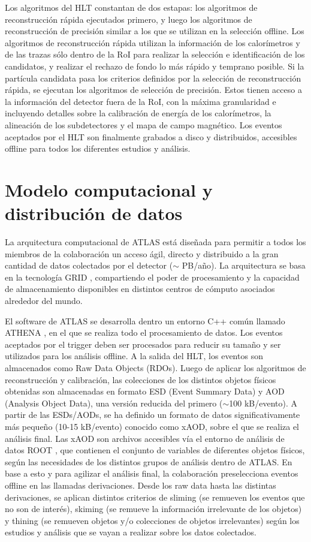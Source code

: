Los algoritmos del HLT constantan de dos estapas: los algoritmos de reconstrucción rápida ejecutados primero, y luego los algoritmos de reconstrucción de precisión similar a los que se utilizan en la selección offline. Los algoritmos de reconstrucción rápida utilizan la información de los calorímetros y de las trazas sólo dentro de la RoI para realizar la selección e identificación de los candidatos, y realizar el rechazo de fondo lo más rápido y temprano posible. Si la partícula candidata pasa los criterios definidos por la selección de reconstrucción rápida, se ejecutan los algoritmos de selección de precisión. Estos tienen acceso a la información del detector fuera de la RoI, con la máxima granularidad e incluyendo detalles sobre la calibración de energía de los calorímetros, la alineación de los subdetectores y el mapa de campo magnético. Los eventos aceptados por el HLT son finalmente grabados a disco y distribuidos, accesibles offline para todos los diferentes estudios y análisis.

\section{Modelo computacional y distribución de datos}


La arquitectura computacional de ATLAS está diseñada para permitir a todos los miembros de la colaboración un acceso ágil, directo y distribuido a la gran cantidad de datos colectados por el detector ($\sim$ PB/año). La arquitectura se basa en la tecnología GRID \cite{grid}, compartiendo el poder de procesamiento y la capacidad de almacenamiento disponibles en distintos centros de cómputo asociados alrededor del
mundo.

El software de ATLAS se desarrolla dentro un entorno C++ común llamado ATHENA \cite{ATLAS-TDR-17, analysistools, athena}, en el que se realiza todo el procesamiento de datos. Los eventos aceptados por el trigger deben ser procesados para reducir su tamaño y ser utilizados para los análisis offline. A la salida del HLT, los eventos son almacenados como Raw Data Objects (RDOs). Luego de aplicar los algoritmos de reconstrucción y calibración, las colecciones de los distintos objetos físicos obtenidas son almacenadas en formato ESD (Event Summary Data) y AOD (Analysis Object Data), una versión reducida del primero ($\sim$100 kB/evento). A partir de las ESDs/AODs, se ha definido un formato de datos significativamente más pequeño (10-15 kB/evento) conocido como xAOD, sobre el que se realiza el análisis final. Las xAOD son archivos accesibles vía el entorno de análisis de datos ROOT \cite{root}, que contienen el conjunto de variables de diferentes objetos físicos, según las necesidades de los distintos grupos de análisis dentro de ATLAS. En base a esto y para agilizar el análisis final, la colaboración preselecciona eventos offline en las llamadas derivaciones. Desde los raw data hasta las distintas derivaciones, se aplican distintos criterios de sliming (se remueven los eventos que no son de interés), skiming (se remueve la información irrelevante de los objetos) y thining (se remueven objetos y/o colecciones de objetos irrelevantes) según los estudios y análisis que se vayan a realizar sobre los datos colectados.

